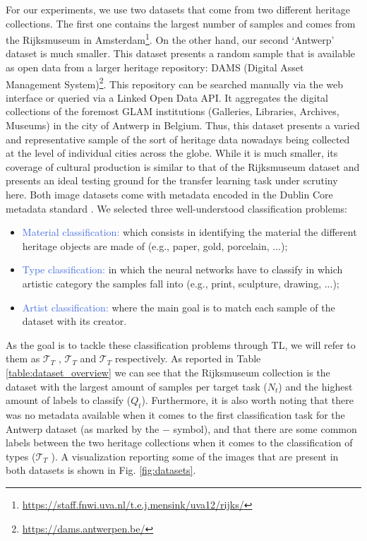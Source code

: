 For our experiments, we use two datasets that come from two different heritage collections. The first one contains the largest number of samples and comes from the Rijksmuseum in Amsterdam\footnote{\url{https://staff.fnwi.uva.nl/t.e.j.mensink/uva12/rijks/}}. On the other hand, our second `Antwerp' dataset is much smaller. This dataset presents a random sample that is available as open data from a larger heritage repository: DAMS (Digital Asset Management System)\footnote{\url{https://dams.antwerpen.be/}}. This repository can be searched manually via the web interface or queried via a Linked Open Data API. It aggregates the digital collections of the foremost GLAM institutions  (Galleries, Libraries, Archives, Museums) in the city of Antwerp in Belgium. Thus, this dataset presents a varied and representative sample of the sort of heritage data nowadays being collected at the level of individual cities across the globe. While it is much smaller, its coverage of cultural production is similar to that of the Rijksmuseum dataset and presents an ideal testing ground for the transfer learning task under scrutiny here. Both image datasets come with metadata encoded in the Dublin Core metadata standard \cite{weibel1998dublin}. We selected three well-understood classification problems:
\begin{itemize}
	\item \textcolor{RoyalBlue}{Material classification:} which consists in identifying the material the different heritage objects are made of (e.g., paper, gold, porcelain, ...); 
	\item \textcolor{RoyalBlue}{Type classification:} in which the neural networks have to classify in which artistic category the samples fall into (e.g., print, sculpture, drawing, ...);
	\item \textcolor{RoyalBlue}{Artist classification:} where the main goal is to match each sample of the dataset with its creator.
\end{itemize}

As the goal is to tackle these classification problems through TL, we will refer to them as $\mathcal{T}_T$ , $\mathcal{T}_T$  and $\mathcal{T}_T$  respectively. As reported in Table \ref{table:dataset_overview} we can see that the Rijksmuseum collection is the dataset with the largest amount of samples per target task ($N_t$) and the highest amount of labels to classify ($Q_t$). Furthermore, it is also worth noting that there was no metadata available when it comes to the first classification task for the Antwerp dataset (as marked by the $-$ symbol), and that there are some common labels between the two heritage collections when it comes to the classification of types ($\mathcal{T}_T$ ). A visualization reporting some of the images that are present in both datasets is shown in Fig. \ref{fig:datasets}.


